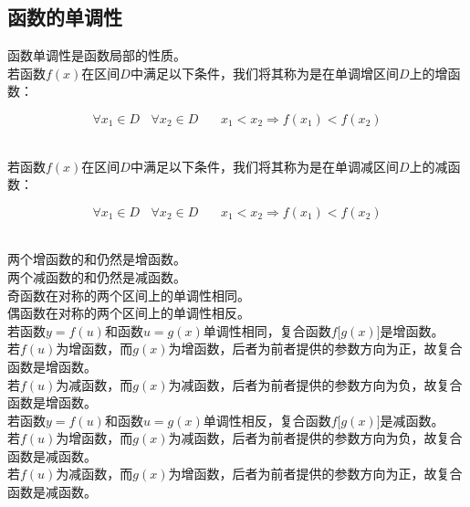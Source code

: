 \documentclass[UTF8]{ctexart}
\begin{document}
\newpage

\subsection{函数的单调性}
    函数单调性是函数局部的性质。\\[3mm]
    若函数$f(x)$在区间$D$中满足以下条件，我们将其称为是在单调增区间$D$上的增函数：
    \begin{large}
        \begin{equation*}
            \forall x_1\in D~~~~\forall x_2\in D~~~~~~~~x_1<x_2\Rightarrow f(x_1)<f(x_2)
        \end{equation*}
    \end{large}\\
    若函数$f(x)$在区间$D$中满足以下条件，我们将其称为是在单调减区间$D$上的减函数：
    \begin{large}
        \begin{equation*}
            \forall x_1\in D~~~~\forall x_2\in D~~~~~~~~x_1<x_2\Rightarrow f(x_1)<f(x_2)
        \end{equation*}
    \end{large}\\
    两个增函数的和仍然是增函数。\\[3mm]
    两个减函数的和仍然是减函数。\\[6mm]
    奇函数在对称的两个区间上的单调性相同。\\[3mm]
    偶函数在对称的两个区间上的单调性相反。\\[6mm]
    若函数$y=f(u)$和函数$u=g(x)$单调性相同，复合函数$f\big[g(x)\big]$是增函数。\\[3mm]
    若$f(u)$为增函数，而$g(x)$为增函数，后者为前者提供的参数方向为正，故复合函数是增函数。\\[3mm]
    若$f(u)$为减函数，而$g(x)$为减函数，后者为前者提供的参数方向为负，故复合函数是增函数。\\[6mm]
    若函数$y=f(u)$和函数$u=g(x)$单调性相反，复合函数$f\big[g(x)\big]$是减函数。\\[3mm]
    若$f(u)$为增函数，而$g(x)$为减函数，后者为前者提供的参数方向为负，故复合函数是减函数。\\[3mm]
    若$f(u)$为减函数，而$g(x)$为增函数，后者为前者提供的参数方向为正，故复合函数是减函数。

\newpage
\end{document}
